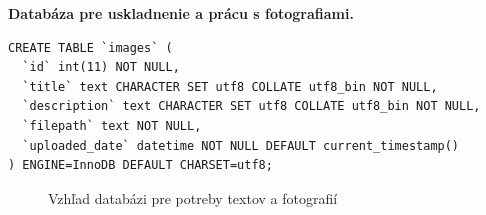 \vspace{0.5cm}
\textbf{Databáza pre uskladnenie a prácu s fotografiami.}
\vspace{0.5cm}
\begin{lstlisting}
CREATE TABLE `images` (
  `id` int(11) NOT NULL,
  `title` text CHARACTER SET utf8 COLLATE utf8_bin NOT NULL,
  `description` text CHARACTER SET utf8 COLLATE utf8_bin NOT NULL,
  `filepath` text NOT NULL,
  `uploaded_date` datetime NOT NULL DEFAULT current_timestamp()
) ENGINE=InnoDB DEFAULT CHARSET=utf8;
\end{lstlisting}


\begin{figure}[!tbh]
\centering
\setlength{\fboxsep}{0pt}%
\setlength{\fboxrule}{1pt}%
\caption{Vzhľad databázi pre potreby textov a fotografií}\label{OBRAZOK 1.17}
\end{figure}
